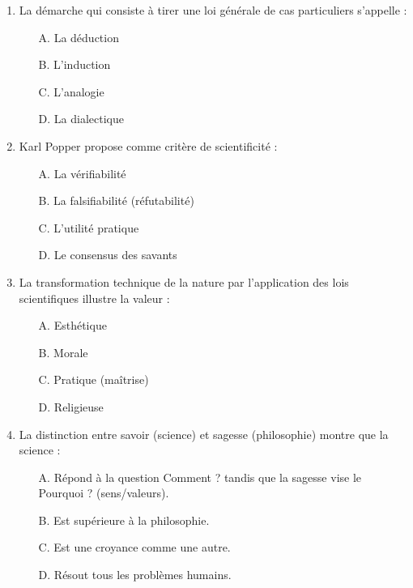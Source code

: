 \documentclass[11pt]{article}
\begin{document}
\begin{exercice}
\begin{enumerate}
    \item La démarche qui consiste à tirer une loi générale de cas particuliers s'appelle :
    \begin{itemize}
        \item[A.] La déduction
        \item[B.] L'induction
        \item[C.] L'analogie
        \item[D.] La dialectique
    \end{itemize}
    \item Karl Popper propose comme critère de scientificité :
    \begin{itemize}
        \item[A.] La vérifiabilité
        \item[B.] La falsifiabilité (réfutabilité)
        \item[C.] L'utilité pratique
        \item[D.] Le consensus des savants
    \end{itemize}
    \item La transformation technique de la nature par l'application des lois scientifiques illustre la valeur :
    \begin{itemize}
        \item[A.] Esthétique
        \item[B.] Morale
        \item[C.] Pratique (maîtrise)
        \item[D.] Religieuse
    \end{itemize}
    \item La distinction entre \og savoir \fg{} (science) et \og sagesse \fg{} (philosophie) montre que la science :
    \begin{itemize}
        \item[A.] Répond à la question \og Comment ? \fg{} tandis que la sagesse vise le \og Pourquoi ? \fg{} (sens/valeurs).
        \item[B.] Est supérieure à la philosophie.
        \item[C.] Est une croyance comme une autre.
        \item[D.] Résout tous les problèmes humains.
    \end{itemize}
\end{enumerate}
\end{exercice}
\end{document}
